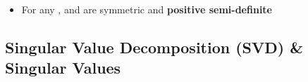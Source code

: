 \begin{itemize}
\begin{itemize}
          \item
                 is positive semi-definite \textbf{iff} all its eigenvalues
                are \textbf{non-negative}
          \item
                 is positive semi-definite =\textgreater{} all its
                diagonals are \textbf{non-negative}
          \item
                 is positive semi-definite =\textgreater{}
                , i.e.~\textbf{no
                  coefficient larger} than on the diagonals
          \item
                 is positive semi-definite =\textgreater{} all
                \textbf{upper-left submatrices} are \emph{also} positive
                semi-definite
          \item
                 is positive semi-definite =\textgreater{} it has a
                {[}{[}tutorial 4\#Cholesky Decomposition\textbar Cholesky
                Decomposition{]}{]}
        \end{itemize}
  \item
        For any ,  and
         are symmetric and \textbf{positive semi-definite}
\end{itemize}

\subsection*{Singular Value Decomposition (SVD) \& Singular
  Values}

